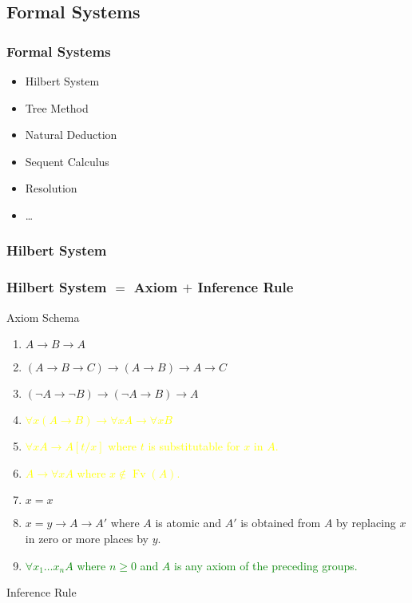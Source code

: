 \documentclass[UTF8,11pt,colorlinks,compress,openany]{beamer}%
\begin{document}
\subsection{Formal Systems}

\begin{frame}\frametitle{Formal Systems}
	\begin{itemize}
		\item Hilbert System
		\item Tree Method
		\item Natural Deduction
		\item Sequent Calculus
		\item Resolution
		\item \dots
	\end{itemize}
\end{frame}

\subsubsection{Hilbert System}

\begin{frame}\frametitle{Hilbert System $=$ Axiom $+$ Inference Rule}\vspace{-1ex}
				\begin{block}{Axiom Schema}
					\begin{enumerate}
						\item $A\to B\to A$
						\item $(A\to B\to C)\to(A\to B)\to A\to C$
						\item $(\neg A\to\neg B)\to(\neg A\to B)\to A$
						\item \textcolor{yellow}{$\forall x(A\to B)\to\forall x A\to\forall x B$}
						\item \textcolor{yellow}{$\forall x A\to A[t/x]$ where $t$ is substitutable for $x$ in $A$.}
						\item \textcolor{yellow}{$A\to\forall x A$ where $x\notin \operatorname{Fv}(A)$.}
						\item $x=x$
						\item $x=y\to A\to A'$ where $A$ is atomic and $A'$ is obtained from $A$ by replacing $x$ in zero or more places by $y$.
						\item \textcolor{green}{$\forall x_1\dots x_n A$ where $n\geq 0$ and $A$ is any axiom of the preceding groups.}
					\end{enumerate}
				\end{block}
				\begin{block}{Inference Rule}
					\begin{prooftree}
						\alwaysSingleLine
						\RightLabel{\textcolor{yellow}{[MP]}}
					\end{prooftree}
				\end{block}
\end{frame}
\end{document}
